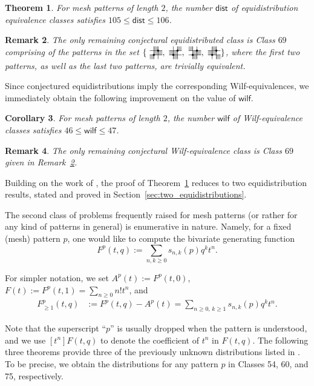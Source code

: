 \documentclass[12pt]{article}
\newtheorem{thm}{Theorem}[section]
\newtheorem{coro}[thm]{Corollary}
\newtheorem{remark}[thm]{Remark}
\def\wilf{\mathsf{wilf}}
\def\dist{\mathsf{dist}}
\newcommand{\pattern}[4]{										
	\raisebox{0.6ex}{
		\begin{tikzpicture}[scale=0.35, baseline=(current bounding box.center), #1]
		\foreach \x/\y in {#4}		\fill[gray!50] (\x,\y) rectangle +(1,1);

		\draw (0.01,0.01) grid (#2+0.99,#2+0.99);
		\foreach \x/\y in {#3}		\filldraw (\x,\y) circle (6pt);
		\end{tikzpicture}}
}
\begin{document}
\begin{thm}\label{thm:classification}
For mesh patterns of length $2$, the number $\dist$ of equidistribution equivalence classes satisfies $105 \le \dist \le 106$. 
\end{thm}

\begin{remark}\label{class-69-remark-equivalence} The only remaining conjectural equidistributed class is Class $69$ comprising of the patterns in the set $\{\pattern{scale=0.5}{2}{1/1,2/2}{1/2,1/1,2/1,0/0},\pattern{scale=0.5}{2}{1/1,2/2}{2/2,0/1,1/1,1/0},\pattern{scale=0.5}{2}{1/1,2/2}{0/2,1/1,2/1,1/0},\pattern{scale=0.5}{2}{1/1,2/2}{1/2,0/1,1/1,2/0} \}$, where the first two patterns, as well as the last two patterns, are trivially equivalent.
\end{remark}

Since conjectured equidistributions imply the corresponding Wilf-equivalences, we immediately obtain the following improvement on the value of $\wilf$.

\begin{coro}
For mesh patterns of length $2$, the number $\wilf$ of Wilf-equivalence classes satisfies $46 \le \wilf \le 47$.
\end{coro}

\begin{remark}\label{class-69-remark-Wilf-equivalence}
The only remaining conjectural Wilf-equivalence class is Class $69$ given in Remark~\ref{class-69-remark-equivalence}.
\end{remark}

Building on the work of \cite{SKZ2026}, the proof of Theorem~\ref{thm:classification} reduces to two equidistribution results, stated and proved in Section~\ref{sec:two_equidistributions}.

The second class of problems frequently raised for mesh patterns (or rather for any kind of patterns in general) is enumerative in nature. Namely, for a fixed (mesh) pattern $p$, one would like to compute the bivariate generating function
$$F^p(t,q) := \sum_{n,k\geq 0}s_{n,k}(p) q^kt^n.$$

For simpler notation, we set $A^p(t):=F^p(t,0)$, $F(t):=F^p(t,1)=\sum_{n\ge 0}n! t^n$, and 
\begin{align*}
F^p_{\geq 1}(t,q) &:= F^p(t,q)-A^p(t)=\sum_{n\geq 0,\, k\ge 1}s_{n,k}(p)q^k t^n.
\end{align*}



Note that the superscript ``$p$'' is usually dropped when the pattern is understood, and we use $[t^n]F(t,q)$ to denote the coefficient of $t^n$ in $F(t,q)$. The following three theorems provide three of the previously unknown distributions listed in \cite{SKZ2026}. To be precise, we obtain the distributions for any pattern $p$ in Classes 54, 60, and 75, respectively.
\end{document}
